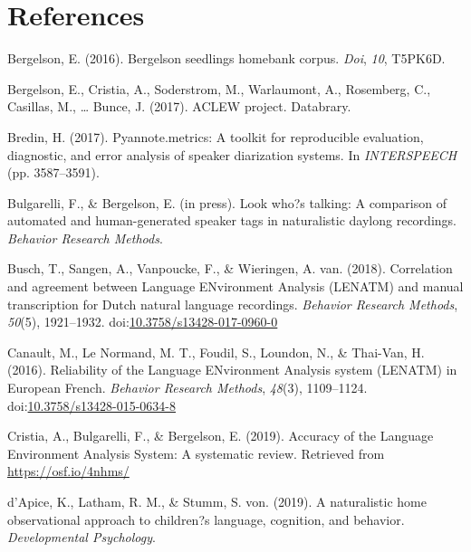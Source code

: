 \documentclass[english,floatsintext,man]{apa6}
\begin{document}
\newpage

\section{References}\label{references}

\setlength{\parindent}{-0.5in} \setlength{\leftskip}{0.5in}

\hypertarget{refs}{}
\hypertarget{ref-bergelson2016bergelson}{}
Bergelson, E. (2016). Bergelson seedlings homebank corpus. \emph{Doi},
\emph{10}, T5PK6D.

\hypertarget{ref-bergelson2017}{}
Bergelson, E., Cristia, A., Soderstrom, M., Warlaumont, A., Rosemberg,
C., Casillas, M., \ldots{} Bunce, J. (2017). ACLEW project. Databrary.

\hypertarget{ref-bredin2017pyannote}{}
Bredin, H. (2017). Pyannote.metrics: A toolkit for reproducible
evaluation, diagnostic, and error analysis of speaker diarization
systems. In \emph{INTERSPEECH} (pp. 3587--3591).

\hypertarget{ref-bulgarelli2019}{}
Bulgarelli, F., \& Bergelson, E. (in press). Look who?s talking: A
comparison of automated and human-generated speaker tags in naturalistic
daylong recordings. \emph{Behavior Research Methods}.

\hypertarget{ref-Busch2018}{}
Busch, T., Sangen, A., Vanpoucke, F., \& Wieringen, A. van. (2018).
Correlation and agreement between Language ENvironment Analysis (LENATM)
and manual transcription for Dutch natural language recordings.
\emph{Behavior Research Methods}, \emph{50}(5), 1921--1932.
doi:\href{https://doi.org/10.3758/s13428-017-0960-0}{10.3758/s13428-017-0960-0}

\hypertarget{ref-Canault2016}{}
Canault, M., Le Normand, M. T., Foudil, S., Loundon, N., \& Thai-Van, H.
(2016). Reliability of the Language ENvironment Analysis system (LENATM)
in European French. \emph{Behavior Research Methods}, \emph{48}(3),
1109--1124.
doi:\href{https://doi.org/10.3758/s13428-015-0634-8}{10.3758/s13428-015-0634-8}

\hypertarget{ref-Cristia}{}
Cristia, A., Bulgarelli, F., \& Bergelson, E. (2019). Accuracy of the
Language Environment Analysis System: A systematic review. Retrieved
from \url{https://osf.io/4nhms/}

\hypertarget{ref-d2019naturalistic}{}
d'Apice, K., Latham, R. M., \& Stumm, S. von. (2019). A naturalistic
home observational approach to children?s language, cognition, and
behavior. \emph{Developmental Psychology}.
\end{document}
